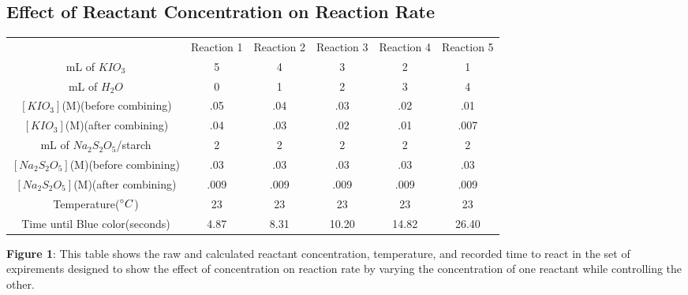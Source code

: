 \documentclass{article}
\begin{document}
\subsection{Effect of Reactant Concentration on Reaction Rate}
\begin{table}[H]
    \begin{center}
    \begin{tabularx}{400pt}{c|c|c|c|c|c} & Reaction 1 & Reaction 2 & Reaction 3 & Reaction 4 & Reaction 5  \\
    mL of $KIO_3$ & 5 & 4 & 3 & 2 & 1 \\
    mL of $H_2O$ & 0 & 1 & 2 & 3 & 4 \\
    $[KIO_3]$(M)(before combining) & .05 & .04 & .03 & .02 & .01 \\
    $[KIO_3]$(M)(after combining) & .04 & .03 & .02 & .01 & .007 \\
    mL of $Na_2S_2O_5$/starch & 2 & 2 & 2 & 2 & 2 \\
    $[Na_2S_2O_5]$(M)(before combining) & .03 & .03 & .03 & .03 & .03 \\
    $[Na_2S_2O_5]$(M)(after combining) & .009 & .009 & .009 & .009 & .009 \\
    Temperature($\degree C$) & 23 & 23 & 23 & 23 & 23 \\
    Time until Blue color(seconds) & 4.87 & 8.31 & 10.20 & 14.82 & 26.40 \\

    \end{tabularx}
    \end{center}
\end{table}
\textbf{Figure 1}: This table shows the raw and calculated reactant concentration, temperature, and recorded time to react in the set of expirements designed to show the effect of concentration on reaction rate by varying the concentration of one reactant while controlling the other.
\end{document}
